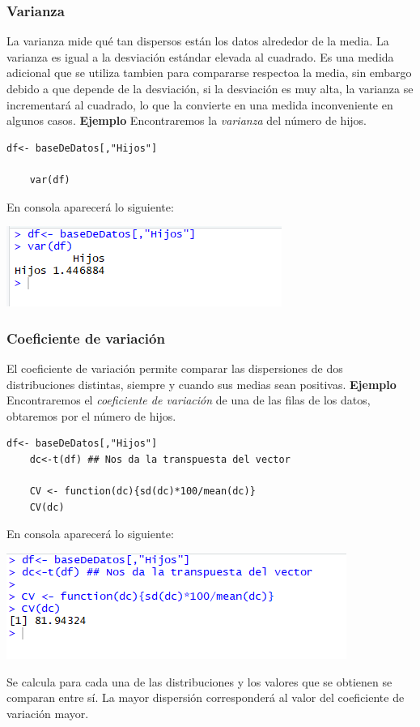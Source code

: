 \documentclass[12pt,hidelinks]{article}
\begin{document}
	\subsubsection{Varianza}
	La varianza mide qué tan dispersos están los datos alrededor de la media. La varianza es igual a la desviación estándar elevada al cuadrado. Es una medida adicional que se utiliza tambien para compararse respectoa la media, sin embargo debido a que depende de la desviación, si la desviación es muy alta, la varianza se incrementará al cuadrado, lo que la convierte en una medida inconveniente en algunos casos. \textbf{Ejemplo} Encontraremos la \textit{varianza} del número de hijos.
	\begin{lstlisting}[frame=single]
	df<- baseDeDatos[,"Hijos"]
	
	var(df)
	\end{lstlisting}
	En consola aparecerá lo siguiente:
	\begin{center}
		\includegraphics[]{images/2/Varianza.PNG}
	\end{center}
	\subsubsection{Coeficiente de variación}
	El coeficiente de variación permite comparar las dispersiones de dos distribuciones distintas, siempre y cuando sus medias sean positivas. \textbf{Ejemplo} Encontraremos el \textit{coeficiente de variación} de una de las filas de los datos, obtaremos por el número de hijos.
	\begin{lstlisting}[frame=single]
	df<- baseDeDatos[,"Hijos"]
	dc<-t(df) ## Nos da la transpuesta del vector
	
	CV <- function(dc){sd(dc)*100/mean(dc)}
	CV(dc)
	\end{lstlisting}
	En consola aparecerá lo siguiente:
	\begin{center}
		\includegraphics[]{images/2/Coeficiente_varianza.PNG}
	\end{center}
	Se calcula para cada una de las distribuciones y los valores que se obtienen se comparan entre sí. La mayor dispersión corresponderá al valor del coeficiente de variación mayor.
\end{document}
